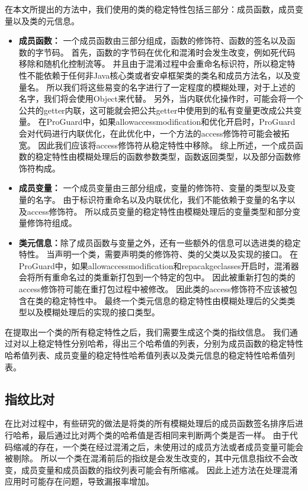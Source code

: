 在本文所提出的方法中，我们使用的类的稳定特性包括三部分：成员函数，成员变量以及类的元信息。

\begin{itemize}
	\item \textbf{成员函数：} 一个成员函数由三部分组成，函数的修饰符、函数的签名以及函数的字节码。
		首先，函数的字节码在优化和混淆时会发生改变，例如死代码移除和随机化控制流等。
		并且由于混淆过程中会重命名标识符，所以稳定特性不能依赖于任何非Java核心类或者安卓框架类的类名和成员方法名，以及变量名。
		所以我们将这些易变的名字进行了一定程度的模糊处理，对于上述的名字，我们将会使用Object来代替。
		另外，当内联优化操作时，可能会将一个公共的getter内联，这可能就会把公共getter中使用到的私有变量更改成公共变量。
		在ProGuard中，如果allowaccessmodification和优化开启时，ProGuard会对代码进行内联优化，在此优化中，一个方法的access修饰符可能会被拓宽。
		因此我们应该将access修饰符从稳定特性中移除。
		综上所述，一个成员函数的稳定特性由模糊处理后的函数参数类型，函数返回类型，以及部分函数修饰符构成。
	\item \textbf{成员变量：} 一个成员变量由三部分组成，变量的修饰符、变量的类型以及变量的名字。
		由于标识符重命名以及内联优化，我们不能依赖于变量的名字以及access修饰符。
		所以成员变量的稳定特性由模糊处理后的变量类型和部分变量修饰符组成。
	\item \textbf{类元信息：}除了成员函数与变量之外，还有一些额外的信息可以选进类的稳定特性。
		当声明一个类，需要声明类的修饰符、类的父类以及实现的接口。
		在ProGuard中，如果allowaccessmodification和repacakgeclasses开启时，混淆器会将所有重命名过的类重新打包到一个特定的包中。
		因此被重新打包的类的access修饰符可能在重打包过程中被修改。
		因此类的access修饰符不应该被包含在类的稳定特性中。
		最终一个类元信息的稳定特性由模糊处理后的父类类型以及模糊处理后的实现的接口类型。
\end{itemize}

在提取出一个类的所有稳定特性之后，我们需要生成这个类的指纹信息。
我们通过对以上稳定特性分别哈希，得出三个哈希值的列表，分别为成员函数的稳定特性哈希值列表、成员变量的稳定特性哈希值列表以及类元信息的稳定特性哈希值列表。

\subsection{指纹比对}

在比对过程中，有些研究的做法是将类的所有模糊处理后的成员函数签名排序后进行哈希，最后通过比对两个类的哈希值是否相同来判断两个类是否一样。
由于代码缩减的存在，一个类在经过混淆之后，未使用过的成员方法或者成员变量可能会被剔除。
所以一个类在混淆前后的指纹是会发生改变的，其中元信息指纹不会改变，成员变量和成员函数的指纹列表可能会有所缩减。
因此上述方法在处理混淆应用时可能存在问题，导致漏报率增加。

